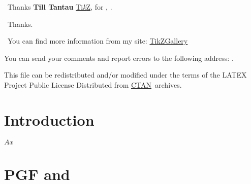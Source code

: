 \documentclass[DIV         = 12,
               fontsize    = 10,
               headinclude = false,
               index       = totoc,
               footinclude = false,
               twoside,
               headings    = small]{tkz-doc}
\begin{document}
\title{\nameofpack}
\date{\today}
\clearpage
\thispagestyle{empty}

\ifpgfnotitlebg
\else
	\maketitle
\fi

\clearpage


\pagecolor{fondpaille}
\color{Maroon}

\nameoffile{\nameofpack}


\presentation

\vspace*{1cm}
\noindent\lefthand\ Thanks \textbf{Till Tantau} \href{http://sourceforge.net/projects/pgf/}{Ti\emph{k}Z},  for , .

\vspace*{12pt}
\noindent\lefthand\ Thanks.

\vspace*{12pt}
\noindent\lefthand\ You can find more information from my site:
\href{http://khaos.github.com/TikZGallery}{TikZGallery}

\vfill 
You can send your comments and report errors to the following address: \href{\authoremail}{\textcolor{blue}{\authorofpack}}.
 
This file can be redistributed and/or modified under the terms of the LATEX 
Project Public License Distributed from \href{http://www.ctan.org/}{CTAN}\  archives.

\clearpage\newpage

\setlength{\parskip}{1ex plus 0.5ex minus 0.2ex} 


\section{Introduction} %
\label{sec:introduction}

\lipsum[1-7]

$Ax$


\clearpage

\section{PGF and \TIKZ{}} %
\label{sec:pgf_and_tikz}
\end{document}
